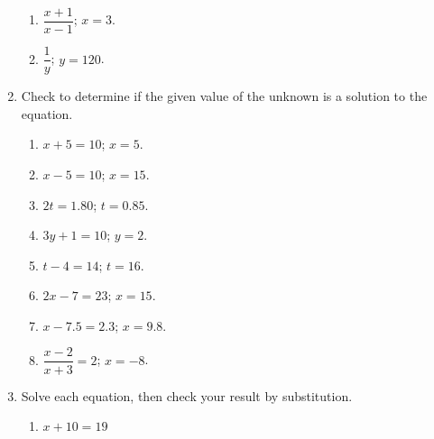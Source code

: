\documentclass[12pt]{article}
\begin{document}
\begin{enumerate}
\begin{multicols}{2}
\begin{enumerate}
	\item \hspace{0.50in} $\dfrac{x+1}{x-1}$; $x=3$.
	\spacing

	\item \hspace{0.50in} $\dfrac{1}{y}$; $y=120$.
	\spacing

	\end{enumerate}
	\end{multicols}
	\spacing

\item Check to determine if the given value of the unknown is a solution to the equation. 
	\begin{multicols}{2}
	\begin{enumerate}
	\item \hspace{0.50in} $x+5=10$; $x=5$. 
	\spacing

	\item \hspace{0.50in} $x-5=10$; $x=15$. 
	\spacing

	\item \hspace{0.50in} $2t=1.80$; $t=0.85$. 
	\spacing

	\item \hspace{0.50in} $3y+1=10$; $y=2$. 
	\spacing

	\item \hspace{0.50in} $t-4=14$; $t=16$. 
	\spacing

	\item \hspace{0.50in} $2x-7=23$; $x=15$. 
	\spacing

	\item \hspace{0.50in} $x-7.5=2.3$; $x=9.8$. 
	\spacing

	\item \hspace{0.50in} $\dfrac{x-2}{x+3}=2$; $x=-8$. 
	\spacing

	\end{enumerate}
	\end{multicols}
	\spacing

\item Solve each equation, then check your result by substitution. 
	\begin{multicols}{2}
	\begin{enumerate}
	\item \hspace{0.50in} $x+10=19$
	\spacing


\end{enumerate}
\end{multicols}
\end{enumerate}
\end{document}
